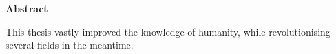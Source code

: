 \begin{flushleft}
	{\LARGE\textbf{Abstract}\\}
\end{flushleft}

This thesis vastly improved the knowledge of humanity, while revolutionising several fields in the meantime. 